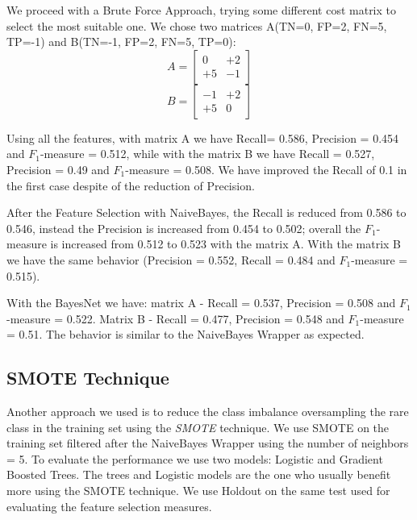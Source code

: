 \documentclass[fleqn,10pt]{SelfArx} %
\begin{document}
We proceed with a Brute Force Approach, trying some different cost matrix to select the most suitable one. \newline
We chose two matrices A(TN=0, FP=2, FN=5, TP=-1) and B(TN=-1, FP=2, FN=5, TP=0):
$$
A=\begin{bmatrix} 
0 & +2 \\
+5 & -1 
\end{bmatrix}
$$
$$
B=\begin{bmatrix} 
-1 & +2 \\
+5 & 0 
\end{bmatrix}
$$ 

Using all the features, with matrix A we have Recall= 0.586, Precision = 0.454 and $F_1$-measure = 0.512, while with the matrix B we have Recall = 0.527, Precision = 0.49 and $F_1$-measure = 0.508. 
We have improved the Recall of 0.1 in the first case despite of the reduction of Precision.

After the Feature Selection with NaiveBayes, the Recall is reduced from 0.586 to 0.546, instead the Precision is increased from 0.454 to 0.502; overall the $F_1$-measure is increased from 0.512 to 0.523 with the matrix A. 
With the matrix B we have the same behavior (Precision = 0.552, Recall = 0.484 and $F_1$-measure = 0.515). 

With the BayesNet we have: matrix A - Recall = 0.537, Precision = 0.508 and $F_1$-measure = 0.522. Matrix B - Recall = 0.477, Precision = 0.548 and $F_1$-measure = 0.51. 
The behavior is similar to the NaiveBayes Wrapper as expected.  

\subsection{SMOTE Technique}
Another approach we used is to reduce the class imbalance oversampling the rare class in the training set using the \textit{SMOTE} technique. \newline
We use SMOTE on the training set filtered after the NaiveBayes Wrapper using the number of neighbors = 5. 
To evaluate the performance we use two models: Logistic and Gradient Boosted Trees. The trees and Logistic models are the one who usually benefit more using the SMOTE technique. 
We use Holdout on the same test used for evaluating the feature selection measures. 
\end{document}
